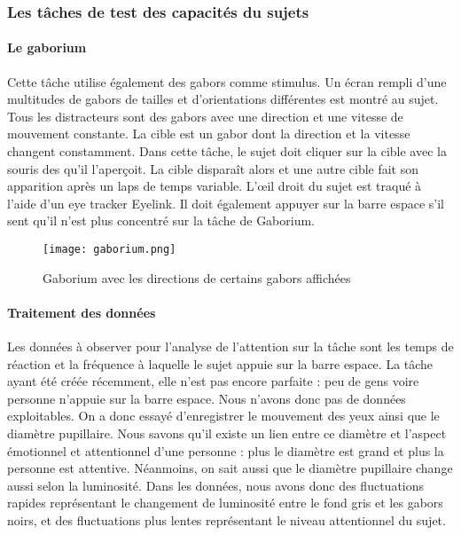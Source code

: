 \subsubsection{Les tâches de test des capacités du sujets}

\paragraph{Le gaborium}Cette tâche utilise également des \glspl{gabor} comme stimulus. Un écran rempli d'une multitudes de gabors de tailles et d'orientations différentes est montré
au sujet. Tous les distracteurs sont des gabors avec une direction et une vitesse de mouvement constante. La cible est un gabor dont la direction et la vitesse changent constamment.
Dans cette tâche, le sujet doit cliquer sur la cible avec la souris des qu'il l'aperçoit. La cible disparaît alors et une autre cible fait son apparition après un laps de temps
variable. L'œil droit du sujet est traqué à l'aide d'un eye tracker Eyelink. Il doit également appuyer sur la barre espace s'il sent qu'il n'est plus concentré sur la tâche de Gaborium.

\begin{figure}[H]
    \begin{center}
    \texttt{[image: gaborium.png]}
    \end{center}
    \caption{Gaborium avec les directions de certains gabors affichées}
\label{Gaborium}
\end{figure}

\paragraph{Traitement des données}Les données à observer pour l'analyse de l'attention sur la tâche sont les temps de réaction et la fréquence à laquelle le sujet appuie sur la barre
espace. La tâche ayant été créée récemment, elle n'est pas encore parfaite : peu de gens voire personne n'appuie sur la barre espace. Nous n'avons donc pas de données exploitables.
On a donc essayé d'enregistrer le mouvement des yeux ainsi que le diamètre pupillaire. Nous savons qu'il existe un lien entre ce diamètre et l'aspect émotionnel et attentionnel d'une
personne : plus le diamètre est grand et plus la personne est attentive. Néanmoins, on sait aussi que le diamètre pupillaire change aussi selon la luminosité. Dans les données, nous
avons donc des fluctuations rapides représentant le changement de luminosité entre le fond gris et les gabors noirs, et des fluctuations plus lentes représentant le niveau attentionnel
du sujet.


